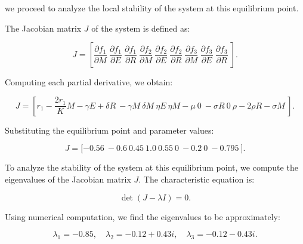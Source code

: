 \documentclass[10pt]{NSP1}
\begin{document}
we proceed to analyze the local stability of the system at this equilibrium point.

\par\medskip{}\smallskip

The Jacobian matrix $J$ of the system is defined as:

\begin{equation}
J = \left\lbrack \frac{\partial f_{1}}{\partial M}\ \frac{\partial f_{1}}{\partial E}\ \frac{\partial f_{1}}{\partial R}\ \frac{\partial f_{2}}{\partial M}\ \frac{\partial f_{2}}{\partial E}\ \frac{\partial f_{2}}{\partial R}\ \frac{\partial f_{3}}{\partial M}\ \frac{\partial f_{3}}{\partial E}\ \frac{\partial f_{3}}{\partial R}\  \right\rbrack.

\end{equation}

Computing each partial derivative, we obtain:

\begin{equation}
J = \left\lbrack r_{1} - \frac{2r_{1}}{K}M - \gamma E + \delta R\  - \gamma M\ \delta M\ \eta E\ \eta M - \mu\ 0\  - \sigma R\ 0\ \rho - 2\rho R - \sigma M\  \right\rbrack.

\end{equation}

Substituting the equilibrium point and parameter values:

\begin{equation}
J = \lbrack - 0.56\  - 0.6\ 0.45\ 1.0\ 0.55\ 0\  - 0.2\ 0\  - 0.795\ \rbrack.

\end{equation}

\par\medskip{}\smallskip

To analyze the stability of the system at this equilibrium point, we compute the eigenvalues of the Jacobian matrix $J$. The characteristic equation is:

\begin{equation}
\det(J - \lambda I) = 0.

\end{equation}

Using numerical computation, we find the eigenvalues to be approximately:

\begin{equation}
\lambda_{1} = - 0.85,\quad\lambda_{2} = - 0.12 + 0.43i,\quad\lambda_{3} = - 0.12 - 0.43i.

\end{equation}
\end{document}
